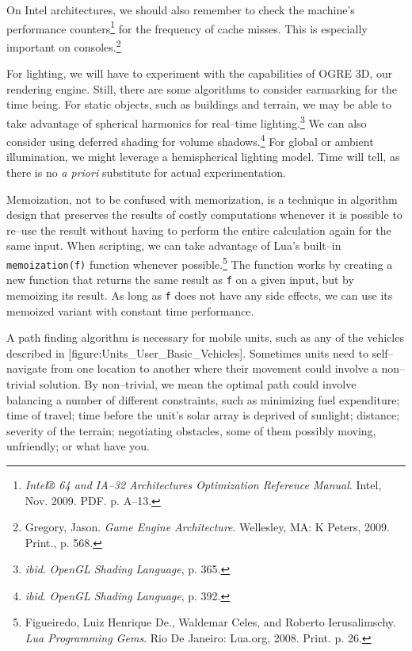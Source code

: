 On Intel architectures, we should also remember to check the machine's performance counters\footnote{{\it Intel® 64 and IA--32 Architectures Optimization Reference Manual}. Intel, Nov. 2009. PDF. p. A--13.} for the frequency of cache misses. This is especially important on consoles.\footnote{Gregory, Jason. {\it Game Engine Architecture}. Wellesley, MA: K Peters, 2009. Print., p. 568.}

For lighting, we will have to experiment with the capabilities of OGRE 3D, our rendering engine. Still, there are some algorithms to consider earmarking for the time being. For static objects, such as buildings and terrain, we may be able to take advantage of spherical harmonics for real--time lighting.\footnote{{\it ibid}. {\it OpenGL Shading Language}, p. 365.} We can also consider using deferred shading for volume shadows.\footnote{{\it ibid}. {\it OpenGL Shading Language}, p. 392.} For global or ambient illumination, we might leverage a hemispherical lighting model. Time will tell, as there is no {\it a priori} substitute for actual experimentation.

Memoization, not to be confused with memorization, is a technique in algorithm design that preserves the results of costly computations whenever it is possible to re--use the result without having to perform the entire calculation again for the same input. When scripting, we can take advantage of Lua's built--in {\tt memoization(f)} function whenever possible.\footnote{ Figueiredo, Luiz Henrique De., Waldemar Celes, and Roberto Ierusalimschy. {\it Lua Programming Gems}. Rio De Janeiro: Lua.org, 2008. Print. p. 26.} The function works by creating a new function that returns the same result as {\tt f} on a given input, but by memoizing its result. As long as {\tt f} does not have any side effects, we can use its memoized variant with constant time performance.

A path finding algorithm is necessary for mobile units, such as any of the vehicles described in [figure:Units_User_Basic_Vehicles]. Sometimes units need to self--navigate from one location to another where their movement could involve a non--trivial solution. By non--trivial, we mean the optimal path could involve balancing a number of different constraints, such as minimizing fuel expenditure; time of travel; time before the unit's solar array is deprived of sunlight; distance; severity of the terrain; negotiating obstacles, some of them possibly moving, unfriendly; or what have you.

